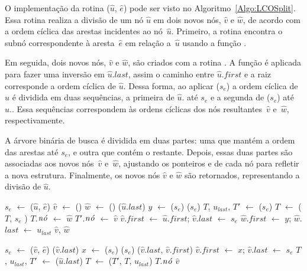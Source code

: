 O implementação da rotina \LCOSplit($\hat u$, $\hat e$) pode ser visto no Algoritmo~\ref{Algo:LCOSplit}.
Essa rotina realiza a divisão de um nó $\hat u$ em dois novos nós, $\hat v$ e $\hat w$, de acordo com a ordem cíclica das arestas incidentes ao nó~$\hat u$.
Primeiro, a rotina encontra o subnó correspondente à aresta~$\hat e$ em relação a~$\hat u$ usando a função \LCOFindSubNode.

Em seguida, dois novos nós, $\hat v$ e $\hat w$, são criados com a rotina \LCOMakeNode.
A função \linkcutEvert{} é aplicada para fazer uma inversão em $\hat u$.$last$, assim o caminho entre $\hat u$.$first$ e a raiz corresponde a ordem cíclica de $\hat u$.
Dessa forma, ao aplicar \linkcutDelEdge($s_e$) a ordem cíclica de~$\hat u$ é dividida em duas sequências, a primeira de $\hat u$. até $s_e$ e a segunda de \linkcutParent($s_e$) até~$\hat u$..
Essa sequências correspondem às ordens cíclicas dos nós resultantes~$\hat v$ e~$\hat w$, respectivamente.

A árvore binária de busca é dividida em duas partes: uma que mantém a ordem das arestas até $s_e$, e outra que contém o restante.
Depois, essas duas partes são associadas aos novos nós~$\hat v$ e~$\hat w$, ajustando os ponteiros  e  de cada nó para refletir a nova estrutura.
Finalmente, os novos nós $\hat v$ e $\hat w$ são retornados, representando a divisão de $\hat u$.

\begin{algorithm}[htb]
\caption{\LCOSplit($\hat u$, $\hat e$)}
\label{Algo:LCOSplit}
\begin{algorithmic}[1]
\State $s_e$ $\gets$ \LCOFindSubNode($\hat u$, $\hat e$)
\State $\hat v$ $\gets$ \LCOMakeNode()
\State $\hat w$ $\gets$ \LCOMakeNode()
\State \linkcutEvert($\hat u$.$last$)
\State $y$ $\gets$ \linkcutParent($s_e$)
\State \linkcutDelEdge($s_e$)
\State $T$, $u_{last}$, $T'$ $\gets$ \treapSplit($s_e$)
\State $T$ $\gets$ \treapJoin($T$, $s_e$  )
\State $T$.$\mathit{n\acute{o}}$ $\gets$ $\hat w$
\State $T'$.$\mathit{n\acute{o}}$ $\gets$ $\hat v$
\State $\hat v$.$first$ $\gets$ $\hat u$.$first$; $\hat v$.$last$ $\gets$ $s_e$
\State $\hat w$.$first$ $\gets$ $y$; $\hat w$.$last$ $\gets$ $u_{last}$
\State \Return $\hat v$, $\hat w$
\end{algorithmic}
\end{algorithm}


\begin{algorithm}[htb]
\caption{\LCOCycle($\hat v$, $\hat e$)}
\label{Algo:LCOCycle}
\begin{algorithmic}[1]
\State $s_e$ $\gets$ \LCOFindSubNode($\hat v$, $\hat e$)
\State \linkcutEvert($\hat v$.$last$)
\State\Return
\EndIf
\State $x$ $\gets$ \linkcutParent($s_e$)
\State \linkcutDelEdge($s_e$)
\State \linkcutAddEdge($\hat v$.$last$, $\hat v$.$first$)
\State $\hat v$.$first$ $\gets$ $x$; $\hat v$.$last$ $\gets$ $s_e$
\State $T$, $u_{last}$, $T'$ $\gets$ \treapSplit($\hat u$.$last$)
\State $T$ $\gets$ \treapJoin($T'$, $T$, $u_{last}$)
\State $T$.$\mathit{n\acute{o}}$ $\hat v$
\end{algorithmic}
\end{algorithm}


